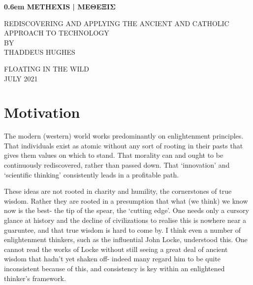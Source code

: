 \documentclass[letterpaper]{article}
\begin{document}
\clearpage
\newcommand\nbvspace[1][3]{\vspace*{\stretch{#1}}}
\newcommand\nbstretchyspace{\spaceskip0.5em plus 0.25em minus 0.25em}
\newcommand{\nbtitlestretch}{\spaceskip0.6em}
\pagestyle{plain}
\begin{center}
  \bfseries
  \nbvspace[1]
  \Huge
  {\nbtitlestretch\huge
    METHEXIS | ΜΕΘΕΞΙΣ}

  \nbvspace[1]
  \normalsize
  REDISCOVERING AND APPLYING THE ANCIENT AND CATHOLIC APPROACH TO TECHNOLOGY\\

  \nbvspace[1]
  \small BY\\
  \Large THADDEUS HUGHES\\

  \nbvspace[2]

  \nbvspace[3]
  \normalsize

  \large
  FLOATING IN THE WILD \\
  \small JULY 2021 \\
\end{center}

\raggedbottom
\tableofcontents

\section{Motivation}

The modern (western) world works predominantly on enlightenment principles. That individuals exist as atomic without any sort of rooting in their pasts that gives them values on which to stand. That morality can and ought to be continuously rediscovered, rather than passed down. That `innovation' and `scientific thinking' consistently leads in a profitable path.

These ideas are not rooted in charity and humility, the cornerstones of true wisdom. Rather they are rooted in a presumption that what (we think) we know now is the best- the tip of the spear, the `cutting edge'. One needs only a cursory glance at history and the decline of civilizations to realise this is nowhere near a guaruntee, and that true wisdom is hard to come by. I think even a number of enlightenment thinkers, such as the influential John Locke, understood this. One cannot read the works of Locke without still seeing a great deal of ancient wisdom that hadn't yet shaken off- indeed many regard him to be quite inconsistent because of this, and consistency is key within an enlightened thinker's framework.
\end{document}
